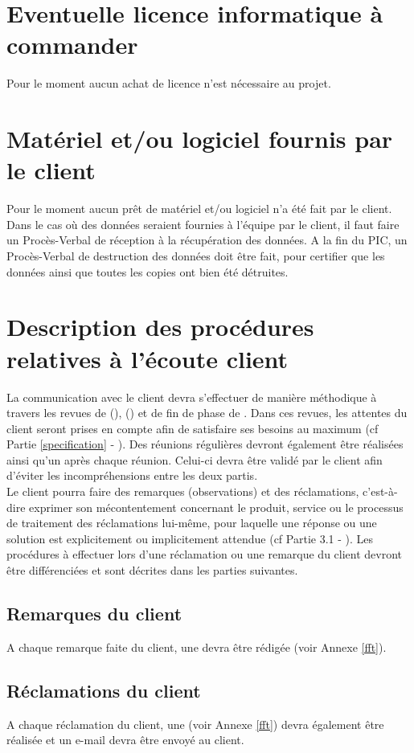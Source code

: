 \section{Eventuelle licence informatique à commander}
\label{Eventuelle licence informatique à commander}
\indent Pour le moment aucun achat de licence n'est nécessaire au projet.

\section{Matériel et/ou logiciel fournis par le client}
\label{Matériel et/ou logiciel fournis par le client}
\indent Pour le moment aucun prêt de matériel et/ou logiciel n'a été fait par le client.\\
\indent Dans le cas où des données seraient fournies à l’équipe \PICCourt par le client, il faut faire un Procès-Verbal de réception à la récupération des données. A la fin du PIC, un Procès-Verbal de destruction des données doit être fait, pour certifier que les données ainsi que toutes les copies ont bien été détruites.

\section{Description des procédures relatives à l'écoute client}
\label{DescrProceduresRelativesALecouteClient}
\indent La communication avec le client devra s'effectuer de manière méthodique à travers les revues de \DSI{} (\DSICourt), \DSE{} (\DSECourt) et de fin de phase de \PICCourt. Dans ces revues, les attentes du client seront prises en compte afin de satisfaire ses besoins au maximum (cf Partie \ref{specification} - \PQCourt). Des réunions régulières devront également être réalisées ainsi qu'un \CRC{} après chaque réunion. Celui-ci devra être validé par le client afin d'éviter les incompréhensions entre les deux partis. \\
Le client pourra faire des remarques (observations) et des réclamations, c'est-à-dire exprimer son mécontentement concernant le produit, service ou le processus de traitement des réclamations lui-même, pour laquelle une réponse ou une solution est explicitement ou implicitement attendue (cf Partie 3.1 - \MQ). 
Les procédures à effectuer lors d'une réclamation ou une remarque du client devront être différenciées et sont décrites dans les parties suivantes.
   
\subsection{Remarques du client}
\label{RqClient}
A chaque remarque faite du client, une \FFT{} devra être rédigée (voir Annexe \ref{fft}).

\subsection{Réclamations du client}
\label{ReclamClient}
A chaque réclamation du client, une \FFT{} (voir Annexe \ref{fft}) devra également être réalisée et un e-mail devra être envoyé au client. 

